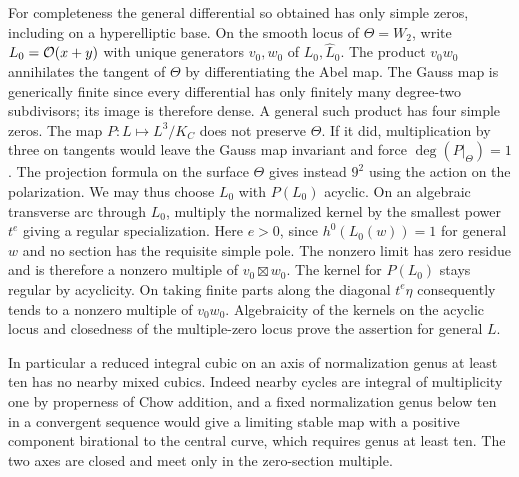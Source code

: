 For completeness the general differential so obtained has only simple
zeros, including on a hyperelliptic base. On the smooth locus of
$\Theta=W_2$, write $L_0=\mathcal O(x+y)$ with unique generators
$v_0,w_0$ of $L_0,\widehat L_0$. The product $v_0w_0$ annihilates
the tangent of $\Theta$ by differentiating the Abel map. The Gauss
map is generically finite since every differential has only finitely
many degree-two subdivisors; its image is therefore dense. A general
such product has four simple zeros. The map $P:L\mapsto L^3/K_C$
does not preserve $\Theta$. If it did, multiplication by three on
tangents would leave the Gauss map invariant and force
$\deg(P|_\Theta)=1$. The projection formula on the surface $\Theta$
gives instead $9^2$ using the action on the polarization. We may thus
choose $L_0$ with $P(L_0)$ acyclic. On an algebraic transverse arc
through $L_0$, multiply the normalized kernel by the smallest
power $t^e$ giving a regular specialization. Here $e>0$, since
$h^0(L_0(w))=1$ for general $w$ and no section has the requisite
simple pole. The nonzero limit has zero residue and is therefore
a nonzero multiple of $v_0\boxtimes w_0$. The kernel for $P(L_0)$
stays regular by acyclicity. On taking finite parts along the diagonal
$t^e\eta$ consequently tends to a nonzero multiple of $v_0w_0$.
Algebraicity of the kernels on the acyclic locus and closedness of the
multiple-zero locus prove the assertion for general $L$.

In particular a reduced integral cubic on an axis of normalization
genus at least ten has no nearby mixed cubics. Indeed nearby cycles
are integral of multiplicity one by properness of Chow addition,
and a fixed normalization genus below ten in a convergent sequence
would give a limiting stable map with a positive component birational
to the central curve, which requires genus at least ten. The two axes
are closed and meet only in the zero-section multiple.
